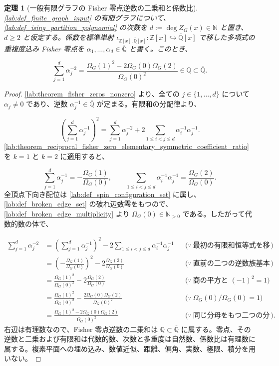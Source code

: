 \documentclass[11pt,a4paper]{article}
\newtheorem{theorem}[definition]{定理}
\theoremstyle{remark}
\begin{document}
\begin{theorem}[一般有限グラフの Fisher 零点逆数の二乗和と係数比]\label{lab:theorem_reciprocal_fisher_zero_square_sum_coefficient_ratio}
\cref{lab:def_finite_graph_input}
 の有限グラフについて、
\cref{lab:def_ising_partition_polynomial}
 の次数を
$d:=\deg Z_G(x)\in\mathbb N$
 と置き、
$d\ge2$
 と仮定する。係数を標準単射
$\iota_{\mathbb Z[x],\overline{\mathbb Q}[x]}:\mathbb Z[x]\hookrightarrow\overline{\mathbb Q}[x]$
 で移した多項式の重複度込み Fisher 零点を
$\alpha_1,\ldots,\alpha_d\in\overline{\mathbb Q}$
 と書く。このとき、

\[\sum_{j=1}^{d}\alpha_j^{-2}
=
\frac{
  \Omega_G(1)^2-2\Omega_G(0)\Omega_G(2)
}{
  \Omega_G(0)^2
}
\in\mathbb Q
\subset\overline{\mathbb Q}.\]
\end{theorem}
\begin{proof}
\cref{lab:theorem_fisher_zeros_nonzero}
 より、全ての
$j\in\{1,\ldots,d\}$
 について
$\alpha_j\ne0$
 であり、逆数
$\alpha_j^{-1}\in\overline{\mathbb Q}$
 が定まる。有限和の分配律より、

\[\left(\sum_{j=1}^{d}\alpha_j^{-1}\right)^2
=
\sum_{j=1}^{d}\alpha_j^{-2}
+
2\sum_{1\le i<j\le d}\alpha_i^{-1}\alpha_j^{-1}.\]
\cref{lab:theorem_reciprocal_fisher_zero_elementary_symmetric_coefficient_ratio}
 を
$k=1$
 と
$k=2$
 に適用すると、

\[\sum_{j=1}^{d}\alpha_j^{-1}
=
-\frac{\Omega_G(1)}{\Omega_G(0)},
\qquad
\sum_{1\le i<j\le d}\alpha_i^{-1}\alpha_j^{-1}
=
\frac{\Omega_G(2)}{\Omega_G(0)}.\]
全頂点下向き配位は
\cref{lab:def_spin_configuration_set}
 に属し、
\cref{lab:def_broken_edge_set}
 の破れ辺数零をもつので、
\cref{lab:def_broken_edge_multiplicity}
 より
$\Omega_G(0)\in\mathbb N_{>0}$
 である。したがって代数的数の体で、

\[\begin{aligned}
\sum_{j=1}^{d}\alpha_j^{-2}
&=
\left(\sum_{j=1}^{d}\alpha_j^{-1}\right)^2
-
2\sum_{1\le i<j\le d}\alpha_i^{-1}\alpha_j^{-1}
&&\bigl(\because\ \text{最初の有限和恒等式を移項する}\bigr)\\
&=
\left(-\frac{\Omega_G(1)}{\Omega_G(0)}\right)^2
-
2\frac{\Omega_G(2)}{\Omega_G(0)}
&&\bigl(\because\ \text{直前の二つの逆数族基本対称式を代入する}\bigr)\\
&=
\frac{\Omega_G(1)^2}{\Omega_G(0)^2}
-
2\frac{\Omega_G(2)}{\Omega_G(0)}
&&\bigl(\because\ \text{商の平方と }(-1)^2=1\bigr)\\
&=
\frac{\Omega_G(1)^2}{\Omega_G(0)^2}
-
\frac{2\Omega_G(0)\Omega_G(2)}{\Omega_G(0)^2}
&&\bigl(\because\ \Omega_G(0)/\Omega_G(0)=1\bigr)\\
&=
\frac{
  \Omega_G(1)^2-2\Omega_G(0)\Omega_G(2)
}{
  \Omega_G(0)^2
}
&&\bigl(\because\ \text{同じ分母をもつ二つの分数を引く}\bigr).
\end{aligned}\]
右辺は有理数なので、Fisher 零点逆数の二乗和は
$\mathbb Q\subset\overline{\mathbb Q}$
 に属する。零点、その逆数と二乗および有限和は代数的数、次数と多重度は自然数、係数比は有理数に属する。複素平面への埋め込み、数値近似、距離、偏角、実数、極限、積分を用いない。

\end{proof}
\end{document}
